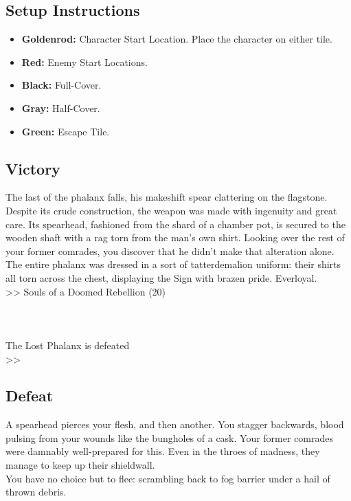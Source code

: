 \subsection*{Setup Instructions}
\begin{itemize}
\item \textbf{Goldenrod:} Character Start Location. Place the character on either tile.
\item \textbf{Red:} Enemy Start Locations.
\item \textbf{Black:} Full-Cover.
\item \textbf{Gray:} Half-Cover.
\item \textbf{Green:} Escape Tile.
\end{itemize}

\pagebreak

\subsection*{Victory}
The last of the phalanx falls, his makeshift spear clattering on the flagstone. Despite its crude construction, the weapon was made with ingenuity and great care. Its spearhead, fashioned from the shard of a chamber pot, is secured to the wooden shaft with a rag torn from the man’s own shirt. Looking over the rest of your former comrades, you discover that he didn’t make that alteration alone. The entire phalanx was dressed in a sort of tatterdemalion uniform: their shirts all torn across the chest, displaying the Sign with brazen pride. Everloyal.\\

>> Souls of a Doomed Rebellion (20)\\
\\
\\
\\
 The Lost Phalanx is defeated\\
>> 

\subsection*{Defeat}
A spearhead pierces your flesh, and then another. You stagger backwards, blood pulsing from your wounds like the bungholes of a cask. Your former comrades were damnably well-prepared for this. Even in the throes of madness, they manage to keep up their shieldwall.\\

You have no choice but to flee: scrambling back to fog barrier under a hail of thrown debris.\\

